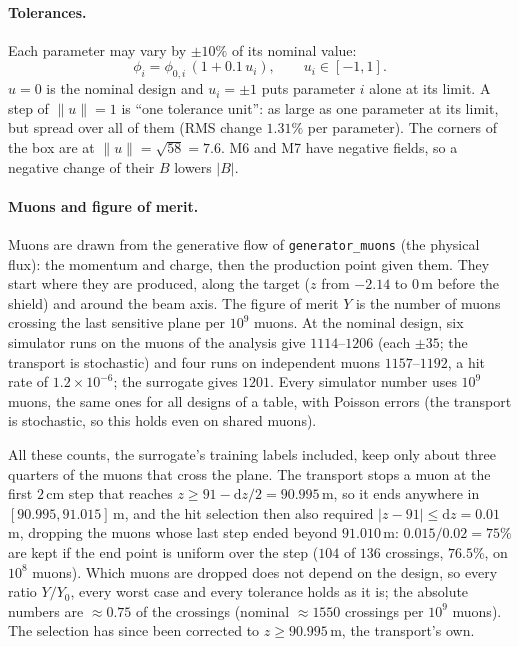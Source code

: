 \documentclass[11pt,a4paper]{article}
\begin{document}
\paragraph{Tolerances.}
Each parameter may vary by $\pm10\%$ of its nominal value:
\begin{equation}
  \phi_i = \phi_{0,i}\,(1 + 0.1\,u_i), \qquad u_i\in[-1,1].
\end{equation}
$u=0$ is the nominal design and $u_i=\pm1$ puts parameter $i$ alone at its limit. A step of
$\|u\|=1$ is ``one tolerance unit'': as large as one parameter at its limit, but spread over all
of them (RMS change $1.31\%$ per parameter). The corners of the box are at $\|u\|=\sqrt{58}=7.6$.
M6 and M7 have negative fields, so a negative change of their $B$ lowers $|B|$.

\paragraph{Muons and figure of merit.}
Muons are drawn from the generative flow of \texttt{generator\_muons} (the physical flux): the
momentum and charge, then the production point given them. They start where they are produced,
along the target ($z$ from $-2.14$ to $0$\,m before the shield) and around the beam axis. The
figure of merit $Y$ is the number of muons crossing the last sensitive plane per $10^9$ muons. At
the nominal design, six simulator runs on the muons of the analysis give $1114$--$1206$ (each
$\pm35$; the transport is stochastic) and four runs on independent muons $1157$--$1192$, a hit
rate of $1.2\times10^{-6}$; the surrogate gives $1201$. Every simulator number uses $10^9$ muons,
the same ones for all designs of a table, with Poisson errors (the transport is stochastic, so
this holds even on shared muons).

All these counts, the surrogate's training labels included, keep only about three quarters of the
muons that cross the plane. The transport stops a muon at the first $2$\,cm step that reaches
$z\geq91-\mathrm{d}z/2=90.995$\,m, so it ends anywhere in $[90.995,91.015]$\,m, and the hit
selection then also required $|z-91|\leq\mathrm{d}z=0.01$\,m, dropping the muons whose last step
ended beyond $91.010$\,m: $0.015/0.02=75\%$ are kept if the end point is uniform over the step
($104$ of $136$ crossings, $76.5\%$, on $10^8$ muons). Which muons are dropped does not depend on the
design, so every ratio $Y/Y_0$, every worst case and every tolerance holds as it is; the absolute
numbers are $\approx0.75$ of the crossings (nominal $\approx1550$ crossings per $10^9$ muons). The
selection has since been corrected to $z\geq90.995$\,m, the transport's own.
\end{document}
